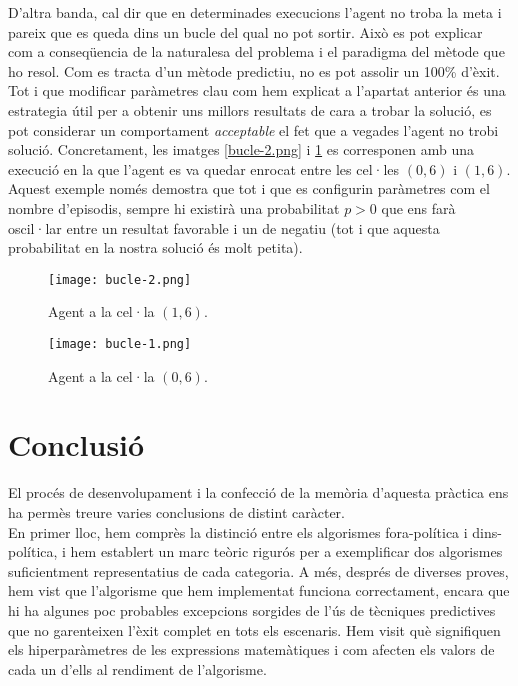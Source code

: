\documentclass{article}
\begin{document}
D'altra banda, cal dir que en determinades execucions l'agent no troba la meta i pareix que es queda dins un bucle del qual no pot sortir. Això es pot explicar com a conseqüencia de la naturalesa del problema i el paradigma del mètode que ho resol. Com es tracta d'un mètode predictiu, no es pot assolir un 100\% d'èxit. Tot i que modificar paràmetres clau com hem explicat a l'apartat anterior és una estrategia útil per a obtenir uns millors resultats de cara a trobar la solució, es pot considerar un comportament \textit{acceptable} el fet que a vegades l'agent no trobi solució. Concretament, les imatges \ref{bucle-2.png} i \ref{bucle-1.png} es corresponen amb una execució en la que l'agent es va quedar enrocat entre les cel·les \((0, 6)\) i \((1,6)\). Aquest exemple només demostra que tot i que es configurin paràmetres com el nombre d'episodis, sempre hi existirà una probabilitat \(p>0\) que ens farà oscil·lar entre un resultat favorable i un de negatiu (tot i que aquesta probabilitat en la nostra solució és molt petita).

\begin{figure}[h!]
    \begin{minipage}{0.4\textwidth}
        \vspace{-0.4cm}
        \texttt{[image: bucle-2.png]}
        \caption{Agent a la cel·la $(1,6)$.}
        \label{bucle-2.png}
    \end{minipage}
    \hfill
    \begin{minipage}{0.4\textwidth}
        \vspace{-0.4cm}
        \texttt{[image: bucle-1.png]}
        \caption{Agent a la cel·la $(0,6)$.}
        \label{bucle-1.png}
    \end{minipage}
\end{figure}
\section{Conclusió}
El procés de desenvolupament i la confecció de la memòria d'aquesta pràctica ens ha permès treure varies conclusions de distint caràcter.\\

En primer lloc, hem comprès la distinció entre els algorismes fora-política i dins-política, i hem establert un marc teòric rigurós per a exemplificar dos algorismes suficientment representatius de cada categoria. A més, després de diverses proves, hem vist que l'algorisme que hem implementat funciona correctament, encara que hi ha algunes poc probables excepcions sorgides de l'ús de tècniques predictives que no garenteixen l'èxit complet en tots els escenaris. Hem visit què signifiquen els hiperparàmetres de les expressions matemàtiques i com afecten els valors de cada un d'ells al rendiment de l'algorisme. \\
\end{document}

